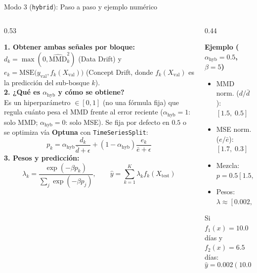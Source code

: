 \documentclass[aspectratio=169,11pt,table]{beamer}
\begin{document}
\begin{frame}{Modo 3 (\texttt{hybrid}): Paso a paso y ejemplo numérico}
\setlength{\abovedisplayskip}{2pt}
\setlength{\belowdisplayskip}{2pt}
\begin{columns}[T,onlytextwidth]
\begin{column}{0.53\textwidth}
\begin{ccdebox}[top=1mm,bottom=1mm]
\scriptsize
\textbf{1. Obtener ambas señales por bloque:}\\
$d_k = \max(0, \widehat{\text{MMD}}^2_k)$ (Data Drift) y $e_k = \text{MSE}\big(y_{\text{val}}, f_k(X_{\text{val}})\big)$ (Concept Drift, donde $f_k(X_{\text{val}})$ es la predicción del sub-bosque $k$).\\[0.06cm]
\textbf{2. ¿Qué es $\alpha_{\text{hyb}}$ y cómo se obtiene?}\\
Es un hiperparámetro $\in [0, 1]$ (no una fórmula fija) que regula cuánto pesa el MMD frente al error reciente ($\alpha_{\text{hyb}}=1$: solo MMD; $\alpha_{\text{hyb}}=0$: solo MSE). Se fija por defecto en $0.5$ o se optimiza vía \textbf{Optuna} con \texttt{TimeSeriesSplit}:
\[p_k = \alpha_{\text{hyb}}\frac{d_k}{\bar{d} + \epsilon} + (1 - \alpha_{\text{hyb}})\frac{e_k}{\bar{e} + \epsilon}\]
\textbf{3. Pesos y predicción:}\\
\[\lambda_k = \frac{\exp(-\beta p_k)}{\sum_j \exp(-\beta p_j)}, \qquad \hat{y} = \sum_{k=1}^K \lambda_k f_k(X_{\text{test}})\]
\end{ccdebox}
\end{column}

\begin{column}{0.44\textwidth}
\begin{keybox}[top=1mm,bottom=1mm]
\scriptsize
\textbf{Ejemplo ($\alpha_{\text{hyb}} = 0.5$, $\beta = 5$)}\\[0.06cm]
\begin{itemize}
  \item MMD norm. ($d/\bar{d}$): $[1.5,\; 0.5]$
  \item MSE norm. ($e/\bar{e}$): $[1.7,\; 0.3]$
  \item Mezcla: $p = 0.5[1.5, 0.5] + 0.5[1.7, 0.3] = [1.6,\; 0.4]$
  \item Pesos: $\lambda \approx [0.002,\; 0.998]$
\end{itemize}
\vspace{0.06cm}
Si $f_1(x) = 10.0$ días y $f_2(x) = 6.5$ días:
\[\hat{y} = 0.002(10.0) + 0.998(6.5) \approx \mathbf{6.51\text{ días}}\]
\end{keybox}
\end{column}
\end{columns}
\end{frame}
\end{document}
